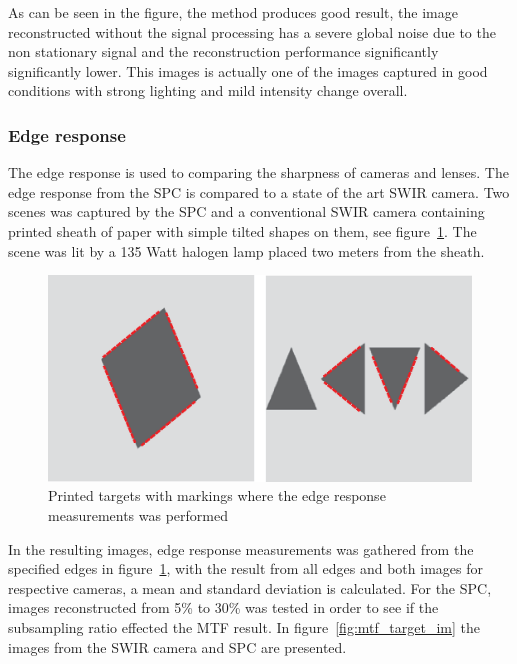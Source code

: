 As can be seen in the figure, the method produces good result, the image reconstructed without the signal processing has a severe global noise due to the non stationary signal and the reconstruction performance significantly significantly lower. This images is actually one of the images captured in good conditions with strong lighting and mild intensity change overall.


\subsubsection{Edge response}
The edge response is used to comparing the sharpness of cameras and lenses. The edge response from the SPC is compared to a state of the art SWIR camera. Two scenes was captured by the SPC and a conventional SWIR camera containing printed sheath of paper with simple tilted shapes on them, see figure~\ref{fig:mtf_target}. The scene was lit by a 135 Watt halogen lamp placed two meters from the sheath.



\begin{figure}[H]
    \centering
    \includegraphics[width=0.8\linewidth]{result/mtf/Target.eps}
    \caption{Printed targets with markings where the edge response measurements was performed}
    \label{fig:mtf_target}
\end{figure}

In the resulting images, edge response measurements was gathered from the specified edges in figure~\ref{fig:mtf_target}, with the result from all edges and both images for respective cameras, a mean and standard deviation is calculated. For the SPC, images reconstructed from 5\% to 30\% was tested in order to see if the subsampling ratio effected the MTF result. In figure~\ref{fig:mtf_target_im} the images from the SWIR camera and SPC are presented.

